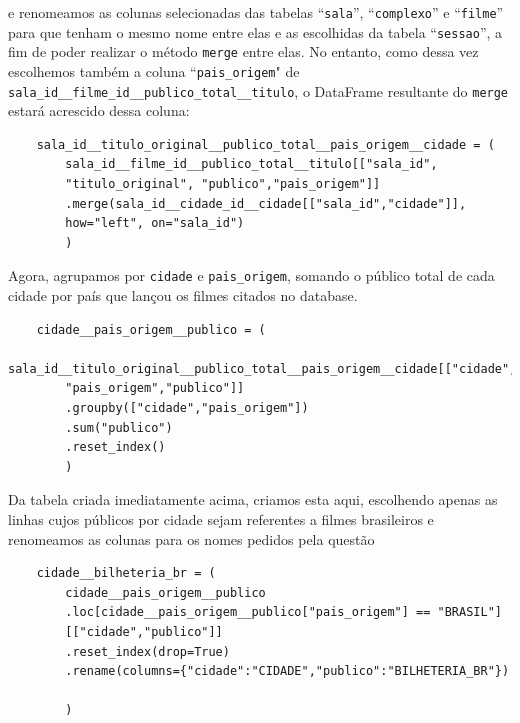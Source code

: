 \documentclass[12pt, a4paper]{article}
\begin{document}
e renomeamos as colunas selecionadas das tabelas ``\texttt{sala}'', ``\texttt{complexo}'' e ``\texttt{filme}'' para que tenham o mesmo nome entre elas e as escolhidas da tabela ``\texttt{sessao}'', a fim de poder realizar o método \texttt{merge} entre elas. No entanto, como dessa vez escolhemos também a coluna ``\texttt{pais\_origem}" de \texttt{sala\_id\_\_filme\_id\_\_publico\_total\_\_titulo}, o DataFrame resultante do \texttt{merge} estará acrescido dessa coluna:
\begin{verbatim}
    sala_id__titulo_original__publico_total__pais_origem__cidade = (
        sala_id__filme_id__publico_total__titulo[["sala_id",
        "titulo_original", "publico","pais_origem"]]
        .merge(sala_id__cidade_id__cidade[["sala_id","cidade"]], 
        how="left", on="sala_id")
        )
\end{verbatim}

Agora, agrupamos por \texttt{cidade} e \texttt{pais\_origem}, somando o público total de cada cidade por país que lançou os filmes citados no database.
\begin{verbatim}
    cidade__pais_origem__publico = (
        sala_id__titulo_original__publico_total__pais_origem__cidade[["cidade",
        "pais_origem","publico"]]
        .groupby(["cidade","pais_origem"])
        .sum("publico")
        .reset_index()
        )
\end{verbatim}

Da tabela criada imediatamente acima, criamos esta aqui, escolhendo apenas as linhas cujos públicos por cidade sejam referentes a filmes brasileiros e renomeamos as colunas para os nomes pedidos pela questão
\begin{verbatim}
    cidade__bilheteria_br = (
        cidade__pais_origem__publico
        .loc[cidade__pais_origem__publico["pais_origem"] == "BRASIL"]
        [["cidade","publico"]]
        .reset_index(drop=True)
        .rename(columns={"cidade":"CIDADE","publico":"BILHETERIA_BR"})
        
        )
\end{verbatim}
\end{document}
